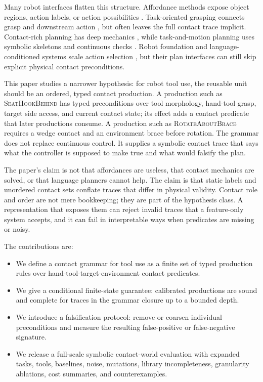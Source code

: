 \documentclass{article}
\begin{document}
Many robot interfaces flatten this structure. Affordance methods expose object regions, action labels, or action possibilities \citep{gibson1979ecological,yamanobe2017affordance,ardon2021affordance}. Task-oriented grasping connects grasp and downstream action \citep{kokic2017affordance,fang2018tog}, but often leaves the full contact trace implicit. Contact-rich planning has deep mechanics \citep{mason1986pushing,erdmann1988sensorless,lynch1996stable,graesdal2024convex}, while task-and-motion planning uses symbolic skeletons and continuous checks \citep{kaelbling2011tamp,toussaint2015logic,garrett2020pddlstream}. Robot foundation and language-conditioned systems scale action selection \citep{ahn2022saycan,brohan2022rt1,brohan2023rt2,liang2023code,huang2023voxposer}, but their plan interfaces can still skip explicit physical contact preconditions.

This paper studies a narrower hypothesis: for robot tool use, the reusable unit should be an ordered, typed contact production. A production such as \textsc{SeatHookBehind} has typed preconditions over tool morphology, hand-tool grasp, target side access, and current contact state; its effect adds a contact predicate that later productions consume. A production such as \textsc{RotateAboutBrace} requires a wedge contact and an environment brace before rotation. The grammar does not replace continuous control. It supplies a symbolic contact trace that says what the controller is supposed to make true and what would falsify the plan.

The paper's claim is not that affordances are useless, that contact mechanics are solved, or that language planners cannot help. The claim is that static labels and unordered contact sets conflate traces that differ in physical validity. Contact role and order are not mere bookkeeping; they are part of the hypothesis class. A representation that exposes them can reject invalid traces that a feature-only system accepts, and it can fail in interpretable ways when predicates are missing or noisy.

The contributions are:
\begin{itemize}
    \item We define a contact grammar for tool use as a finite set of typed production rules over hand-tool-target-environment contact predicates.
    \item We give a conditional finite-state guarantee: calibrated productions are sound and complete for traces in the grammar closure up to a bounded depth.
    \item We introduce a falsification protocol: remove or coarsen individual preconditions and measure the resulting false-positive or false-negative signature.
    \item We release a full-scale symbolic contact-world evaluation with expanded tasks, tools, baselines, noise, mutations, library incompleteness, granularity ablations, cost summaries, and counterexamples.
\end{itemize}
\end{document}
